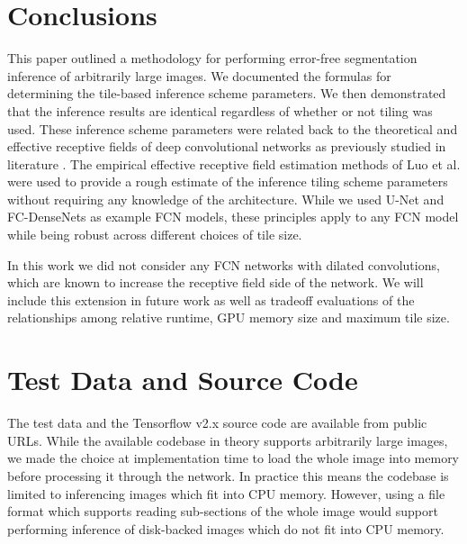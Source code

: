 \documentclass[twoside,11pt]{article}
\newif\ifcamera
\begin{document}
\section{Conclusions}
\label{conclusion}

This paper outlined a methodology for performing error-free segmentation inference of arbitrarily large images. 
We documented the formulas for determining the tile-based inference scheme parameters. We then demonstrated that the inference results are identical regardless of whether or not tiling was used. These inference scheme parameters were related back to the theoretical and effective receptive fields of deep convolutional networks as previously studied in literature \citep{Luo2016}. The empirical effective receptive field estimation methods of Luo et al. \citep{Luo2016} were used to provide a rough estimate of the inference tiling scheme parameters without requiring any knowledge of the architecture.
While we used U-Net and FC-DenseNets as example FCN models, these principles apply to any FCN model while being robust across different choices of tile size. 

In this work we did not consider any FCN networks with dilated convolutions, which are known to increase the receptive field side of the network. We will include this extension in future work as well as tradeoff evaluations of the relationships among relative runtime, GPU memory size and maximum tile size.




\section{Test Data and Source Code}
The test data and the Tensorflow v2.x source code are available from public URLs\ifcamera\footnote{
\url{https://isg.nist.gov/deepzoomweb/data/stemcellpluripotency} \\
\url{https://github.com/usnistgov/semantic-segmentation-unet/tree/ooc-inference}.}\fi.
While the available codebase in theory supports arbitrarily large images, we made the choice at implementation time to load the whole image into memory before processing it through the network. In practice this means the codebase is limited to inferencing images which fit into CPU memory. However, using a file format which supports reading sub-sections of the whole image would support performing inference of disk-backed images which do not fit into CPU memory. 
\end{document}
